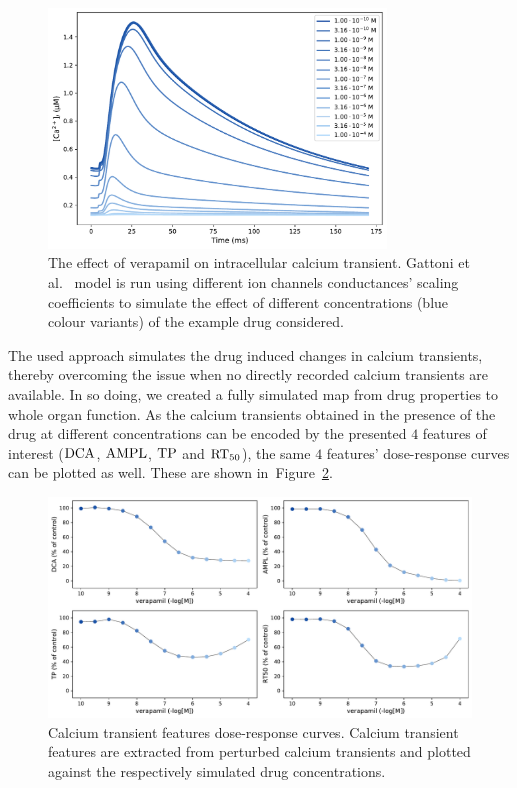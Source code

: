 \begin{figure}[!ht]
    \myfloatalign
    \includegraphics[width=0.8\textwidth]{figures/chapter06/verapamil_calcium_curve_drug.pdf}
    \caption{The effect of verapamil on intracellular calcium transient. Gattoni et al.~\cite{Gattoni:2017} model is run using different ion channels conductances' scaling coefficients to simulate the effect of different concentrations (blue colour variants) of the example drug considered.}
    \label{fig:calciumverapamil}
\end{figure}


\noindent
The used approach simulates the drug induced changes in calcium transients, thereby overcoming the issue when no directly recorded calcium transients are available. In so doing, we created a fully simulated map from drug properties to whole organ function. As the calcium transients obtained in the presence of the drug at different concentrations can be encoded by the presented $4$ features of interest ($\textrm{DCA}$, $\textrm{AMPL}$, $\textrm{TP}$ and $\textrm{RT}_{50}$), the same $4$ features' dose-response curves can be plotted as well. These are shown in~Figure~\ref{fig:cafeatsverapamilrespcurve}.

\begin{figure}[!ht]
    \myfloatalign
    \includegraphics[width=\textwidth]{figures/chapter06/verapamil_dose_calcium_response_curve_drug.pdf}
    \caption{Calcium transient features dose-response curves. Calcium transient features are extracted from perturbed calcium transients and plotted against the respectively simulated drug concentrations.}
    \label{fig:cafeatsverapamilrespcurve}
\end{figure}

